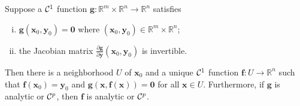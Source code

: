 \begin{thm}
  \label{thm:implicitFunction}
  Suppose a ${\cal C}^1$ function $\mathbf{g}: \mathbb{R}^m\times
  \mathbb{R}^n\to \mathbb{R}^n$
  satisfies
  \begin{enumerate}[(i)]\itemsep0em
  \item
    $\mathbf{g}(\mathbf{x}_0, \mathbf{y}_0)=\mathbf{0}$
    where $(\mathbf{x}_0, \mathbf{y}_0)\in \mathbb{R}^m\times
    \mathbb{R}^n$; 
  \item
    the Jacobian matrix $\frac{\partial \mathbf{g}}{\partial \mathbf{y}}(\mathbf{x}_0, \mathbf{y}_0)$ is invertible.
  \end{enumerate}
  Then there is a neighborhood $U$ of $\mathbf{x}_0$ and
  a unique ${\cal C}^1$ function $\mathbf{f}: U\to \mathbb{R}^n$
  such that
  $\mathbf{f}(\mathbf{x}_0) = \mathbf{y}_0$
  and $\mathbf{g}(\mathbf{x}, \mathbf{f}(\mathbf{x}))=\mathbf{0}$
  for all $\mathbf{x}\in U$.
  Furthermore, if $\mathbf{g}$ is analytic or ${\cal C}^p$,
  then $\mathbf{f}$ is analytic or ${\cal C}^p$.
\end{thm}



